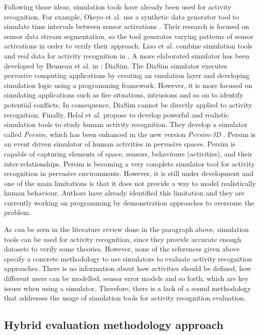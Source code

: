 Following those ideas, simulation tools have already been used for activity recognition. For example, Okeyo et al. use a synthetic data generator tool to simulate time intervals between sensor activations \cite{Okeyo2012a}. Their research is focused on sensor data stream segmentation, so the tool generates varying patterns of sensor activations in order to verify their approach. Liao et al. combine simulation tools and real data for activity recognition in \cite{Liao2006}. A more elaborated simulator has been developed by Bruneau et al. in \cite{Bruneau2009}: DiaSim. The DiaSim simulator executes pervasive computing applications by creating an emulation layer and developing simulation logic using a programming framework. However, it is more focused on simulating applications such as fire situations, intrusions and so on to identify potential conflicts. In consequence, DiaSim cannot be directly applied to activity recognition. Finally, Helal et al. propose to develop powerful and realistic simulation tools to study human activity recognition. They develop a simulator called \textit{Persim}, which has been enhanced in the new version \textit{Persim-3D} \cite{Helal2012}. Persim is an event driven simulator of human activities in pervasive spaces. Persim is capable of capturing elements of space, sensors, behaviours (activities), and their inter-relationships. Persim is becoming a very complete simulator tool for activity recognition in pervasive environments. However, it is still under development and one of the main limitations is that it does not provide a way to model realistically human behaviour. Authors have already identified this limitation and they are currently working on programming by demonstration approaches to overcome the problem.

As can be seen in the literature review done in the paragraph above, simulation tools can be used for activity recognition, since they provide accurate enough datasets to verify some theories. However, none of the references given above specify a concrete methodology to use simulators to evaluate activity recognition approaches. There is no information about how activities should be defined, how different users can be modelled, sensor error models and so forth, which are key issues when using a simulator. Therefore, there is a lack of a sound methodology that addresses the usage of simulation tools for activity recognition evaluation. 

\subsection{Hybrid evaluation methodology approach}
\label{subsec:evaluation:hybrid}

